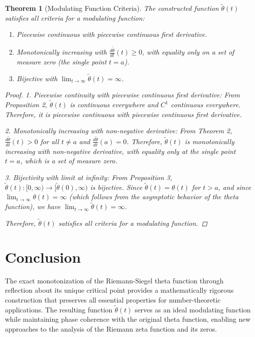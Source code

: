 \documentclass{article}
\newtheorem{theorem}{Theorem}
\theoremstyle{definition}
\begin{document}
\begin{theorem}[Modulating Function Criteria]
The constructed function $\tilde{\theta}(t)$ satisfies all criteria for a modulating function:
\begin{enumerate}
    \item Piecewise continuous with piecewise continuous first derivative.
    \item Monotonically increasing with $\frac{d\tilde{\theta}}{dt}(t) \geq 0$, with equality only on a set of measure zero (the single point $t = a$).
    \item Bijective with $\lim_{t \to \infty} \tilde{\theta}(t) = \infty$.
\end{enumerate}

\begin{proof}
1. Piecewise continuity with piecewise continuous first derivative:
   From Proposition 2, $\tilde{\theta}(t)$ is continuous everywhere and $C^1$ continuous everywhere. Therefore, it is piecewise continuous with piecewise continuous first derivative.

2. Monotonically increasing with non-negative derivative:
   From Theorem 2, $\frac{d\tilde{\theta}}{dt}(t) > 0$ for all $t \neq a$ and $\frac{d\tilde{\theta}}{dt}(a) = 0$. Therefore, $\tilde{\theta}(t)$ is monotonically increasing with non-negative derivative, with equality only at the single point $t = a$, which is a set of measure zero.

3. Bijectivity with limit at infinity:
   From Proposition 3, $\tilde{\theta}(t): [0,\infty) \to [\tilde{\theta}(0),\infty)$ is bijective. Since $\tilde{\theta}(t) = \theta(t)$ for $t > a$, and since $\lim_{t\to\infty}\theta(t) = \infty$ (which follows from the asymptotic behavior of the theta function), we have $\lim_{t\to\infty}\tilde{\theta}(t) = \infty$.

Therefore, $\tilde{\theta}(t)$ satisfies all criteria for a modulating function.
\end{proof}
\end{theorem}

\section{Conclusion}

The exact monotonization of the Riemann-Siegel theta function through reflection about its unique critical point provides a mathematically rigorous construction that preserves all essential properties for number-theoretic applications. The resulting function $\tilde{\theta}(t)$ serves as an ideal modulating function while maintaining phase coherence with the original theta function, enabling new approaches to the analysis of the Riemann zeta function and its zeros.
\end{document}
